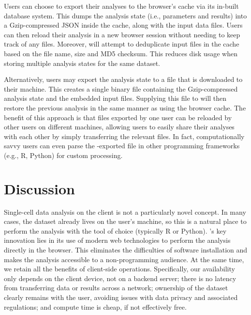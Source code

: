 \documentclass{article}
\begin{document}
Users can choose to export their analyses to the browser's cache via its in-built  database system.
This dumps the analysis state (i.e., parameters and results) into a Gzip-compressed JSON inside the cache, along with the input data files.
Users can then reload their analysis in a new browser session without needing to keep track of any files.
Moreover,  will attempt to deduplicate input files in the cache based on the file name, size and MD5 checksum.
This reduces disk usage when storing multiple analysis states for the same dataset. 

Alternatively, users may export the analysis state to a file that is downloaded to their machine.
This creates a single binary file containing the Gzip-compressed analysis state and the embedded input files.
Supplying this file to  will then restore the previous analysis in the same manner as using the browser cache.
The benefit of this approach is that files exported by one user can be reloaded by other users on different machines,
allowing users to easily share their analyses with each other by simply transferring the relevant files.
In fact, computationally savvy users can even parse the -exported file in other programming frameworks (e.g., R, Python) for custom processing.

\section{Discussion}

Single-cell data analysis on the client is not a particularly novel concept.
In many cases, the dataset already lives on the user's machine, so this is a natural place to perform the analysis with the tool of choice (typically R or Python).
's key innovation lies in its use of modern web technologies to perform the analysis directly in the browser.
This eliminates the difficulties of software installation and makes the analysis accessible to a non-programming audience.
At the same time, we retain all the benefits of client-side operations.
Specifically, our availability only depends on the client device, not on a backend server;
there is no latency from transferring data or results across a network;
ownership of the dataset clearly remains with the user, avoiding issues with data privacy and associated regulations;
and compute time is cheap, if not effectively free.
\end{document}
